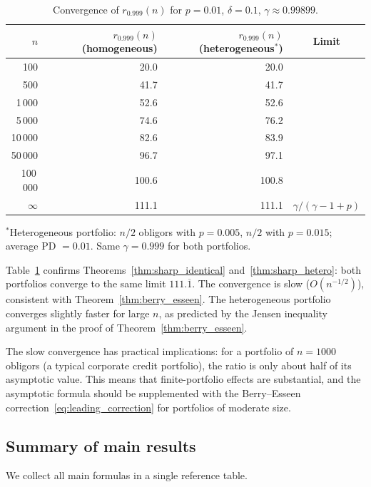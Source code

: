 \documentclass[11pt]{article}
\theoremstyle{definition}
\newcommand{\1}{\mathbf{1}}
\begin{document}
\begin{table}[h]
\centering
\caption{Convergence of $r_{0.999}(n)$ for $p = 0.01$, $\delta = 0.1$, $\gamma \approx 0.99899$.}
\label{tab:convergence}
\begin{tabular}{rrrc}
\toprule
$n$ & $r_{0.999}(n)$ (homogeneous) & $r_{0.999}(n)$ (heterogeneous$^*$) & Limit \\
\midrule
100 & 20.0 & 20.0 & \\
500 & 41.7 & 41.7 & \\
1\,000 & 52.6 & 52.6 & \\
5\,000 & 74.6 & 76.2 & \\
10\,000 & 82.6 & 83.9 & \\
50\,000 & 96.7 & 97.1 & \\
100\,000 & 100.6 & 100.8 & \\
$\infty$ & 111.1 & 111.1 & $\gamma/(\gamma-1+p)$ \\
\bottomrule
\end{tabular}
\begin{flushleft}
\small $^*$Heterogeneous portfolio: $n/2$ obligors with $p = 0.005$, $n/2$ with $p = 0.015$; average PD $= 0.01$. Same $\gamma = 0.999$ for both portfolios.
\end{flushleft}
\end{table}

Table~\ref{tab:convergence} confirms Theorems~\ref{thm:sharp_identical} and~\ref{thm:sharp_hetero}: both portfolios converge to the same limit $111.\overline{1}$. The convergence is slow ($O(n^{-1/2})$), consistent with Theorem~\ref{thm:berry_esseen}. The heterogeneous portfolio converges slightly faster for large $n$, as predicted by the Jensen inequality argument in the proof of Theorem~\ref{thm:berry_esseen}.

The slow convergence has practical implications: for a portfolio of $n = 1000$ obligors (a typical corporate credit portfolio), the ratio is only about half of its asymptotic value. This means that finite-portfolio effects are substantial, and the asymptotic formula should be supplemented with the Berry--Esseen correction~\eqref{eq:leading_correction} for portfolios of moderate size.

\subsection{Summary of main results}

We collect all main formulas in a single reference table.
\end{document}

